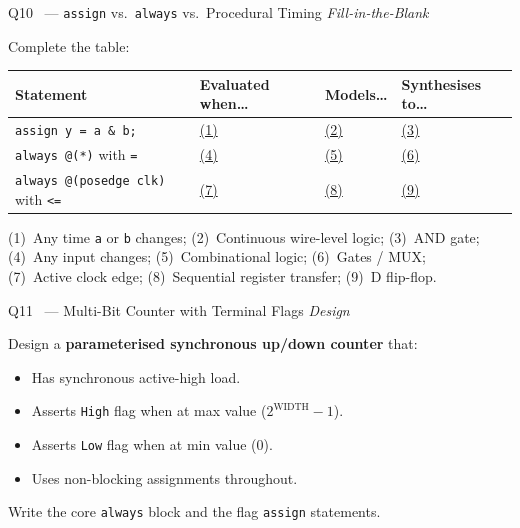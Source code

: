 \documentclass[12pt,a4paper]{article}
\newcommand{\advanced}{%
  \fbox{\textcolor{advred}{\bfseries\sffamily\small ADVANCED}}}
\begin{document}
\begin{questionbox}{Q10 \advanced\ --- \texttt{assign} vs.\ \texttt{always} vs.\ Procedural Timing \hfill\textit{Fill-in-the-Blank}}

Complete the table:

\begin{center}
\begin{tabularx}{\linewidth}{|l|X|X|X|}
\hline
\rowcolor{dkblue!15}
\textbf{Statement} & \textbf{Evaluated when\ldots} & \textbf{Models\ldots} & \textbf{Synthesises to\ldots}\\
\hline
\texttt{assign y = a \& b;} & \underline{(1)} & \underline{(2)} & \underline{(3)}\\
\hline
\texttt{always @(*)} with \texttt{=} & \underline{(4)} & \underline{(5)} & \underline{(6)}\\
\hline
\texttt{always @(posedge clk)} with \texttt{<=} & \underline{(7)} & \underline{(8)} & \underline{(9)}\\
\hline
\end{tabularx}
\end{center}
\end{questionbox}

\begin{answerbox}
(1)~Any time \texttt{a} or \texttt{b} changes;\quad
(2)~Continuous wire-level logic;\quad
(3)~AND gate;\\
(4)~Any input changes;\quad
(5)~Combinational logic;\quad
(6)~Gates / MUX;\\
(7)~Active clock edge;\quad
(8)~Sequential register transfer;\quad
(9)~D flip-flop.
\end{answerbox}

\begin{questionbox}{Q11 \advanced\ --- Multi-Bit Counter with Terminal Flags \hfill\textit{Design}}

Design a \textbf{parameterised synchronous up/down counter} that:
\begin{itemize}
  \item Has synchronous active-high load.
  \item Asserts \texttt{High} flag when at max value ($2^{\text{WIDTH}}-1$).
  \item Asserts \texttt{Low} flag when at min value ($0$).
  \item Uses non-blocking assignments throughout.
\end{itemize}
Write the core \texttt{always} block and the flag \texttt{assign} statements.
\end{questionbox}
\end{document}
